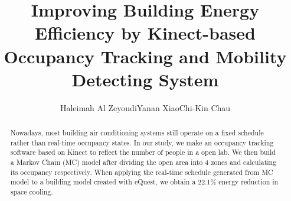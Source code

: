 \documentclass{sig-alternate}
\begin{document}
\title{Improving Building Energy Efficiency by Kinect-based Occupancy
  Tracking and Mobility Detecting System}

\author{
\alignauthor
Haleimah Al Zeyoudi\quad Yanan Xiao\quad Chi-Kin Chau\\
}



\maketitle{}



\begin{abstract}
  Nowadays, most building air conditioning systems still operate on a
  fixed schedule rather than real-time occupancy states. In our study, we
  make an occupancy tracking software based on Kinect to reflect the
  number of people in a open lab. We then build a Markov Chain (MC)
  model after dividing the open area into 4 zones and calculating its
  occupancy respectively. When applying the real-time schedule
  generated from MC model to a building model created with eQuest, we
  obtain a 22.1\% energy reduction in space cooling. 
\end{abstract}









\end{document}
